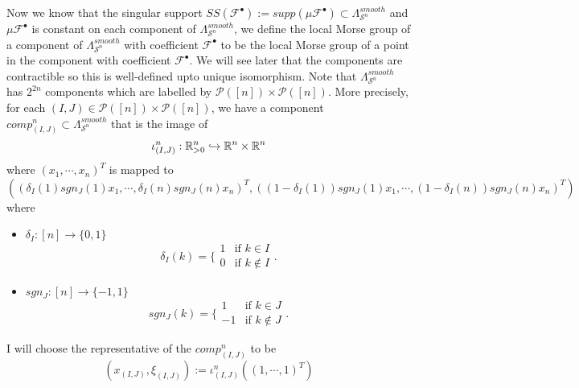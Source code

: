 Now we know that the singular support $SS(\mathscr{F}^\bullet):= supp(\mu \mathscr{F}^\bullet) \subset \Lambda_{\mathcal{S}^n}^{smooth}$ and $\mu\mathcal{F}^\bullet$ is constant on each component of $\Lambda_{
\mathcal{S}^n}^{smooth}$, we define the local Morse group of a component of $\Lambda_{\mathcal{S}^n}^{smooth}$ with coefficient $\mathscr{F}^\bullet$ to be the local Morse group of a point in the component with coefficient $\mathscr{F}^\bullet$. We will see later that the components are contractible so this is well-defined upto unique isomorphism.
Note that $\Lambda_{\mathcal{S}^n}^{smooth}$ has $2^{2n}$ components which are labelled by $\mathcal{P}([n])\times \mathcal{P}([n])$. More precisely, for each $(I,J)\in \mathcal{P}([n])\times \mathcal{P}([n])$, we have a component $comp^n_{(I,J)}\subset \Lambda_{\mathcal{S}^n}^{smooth}$ that is the image of 
\[
\iota^n_{(I,J)}:\mathbb{R}^n_{>0} \hookrightarrow \mathbb{R}^n\times \mathbb{R}^n
\]
where $(x_1,\cdots,x_n)^T$ is mapped to 
\[((\delta_I(1)sgn_J(1)x_1,\cdots,\delta_I(n)sgn_J(n)x_n)^T,((1-\delta_I(1))sgn_J(1)x_1,\cdots,(1-\delta_I(n))sgn_J(n)x_n)^T)
\]
where
\begin{itemize}
\item $\delta_I : [n] \rightarrow \{0,1\}$
\[\delta_I(k)=\bigg\{
\begin{array}{ll}
    1 & \text{if } k\in I \\
    0 & \text{if } k\not\in I
\end{array}
\bigg.
\]

\item $sgn_J : [n] \rightarrow \{-1,1\}$
\[sgn_J(k)=\bigg\{
\begin{array}{ll}
    1 & \text{if } k\in J \\
    -1 & \text{if } k\not\in J
\end{array}
\bigg.
\]
\end{itemize}

I will choose the representative of the $comp^n_{(I,J)}$ to be 
\[
(x_{(I,J)},\xi_{(I,J)}) := \iota^n_{(I,J)}((1,\cdots,1)^T)
\]

